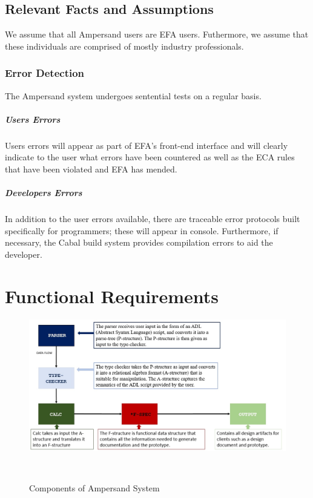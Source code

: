 \documentclass[12pt]{report}
\begin{document}

\section{Relevant Facts and Assumptions}\label{sec:Assumptions}
We assume that all Ampersand users are EFA users. Futhermore, we assume that 
these individuals are comprised of mostly industry professionals.
\subsection{Error Detection}\label{subsec:ErrorDetection}
The Ampersand system undergoes sentential tests on a regular basis.
\paragraph{Users Errors \\}
\noindent
Users errors will appear as part of EFA's front-end interface and will clearly 
indicate to the user what errors have been countered as well as the ECA rules 
that have been violated and EFA has mended.
\paragraph{Developers Errors \\}
\noindent
In addition to the user errors available, there are traceable error protocols 
built specifically for programmers; these will appear in console. Furthermore, 
if necessary, the Cabal build system provides compilation errors to aid the 
developer.

\chapter{Functional Requirements}\label{ch:Functional}
\begin{figure}[!htb]
    \centering
    \includegraphics[width=\textwidth]{../figures/ampersand_parts}
    \caption{Components of Ampersand System}~\label{fig:AmpersandParts}
\end{figure}
\end{document}
